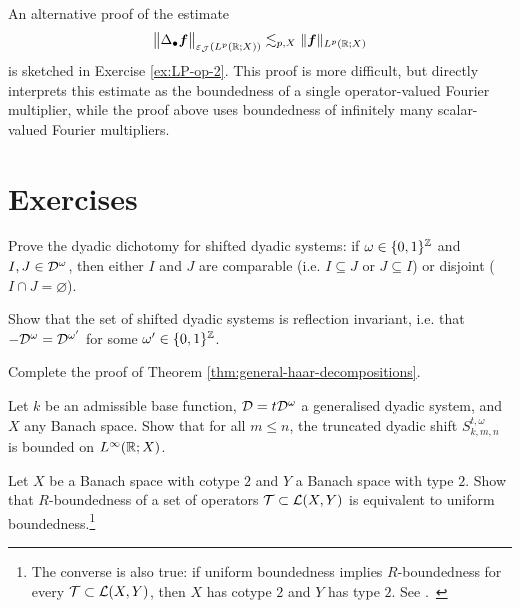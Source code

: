 An alternative proof of the estimate
\begin{equation*}
  \big\| \Delta_{\bullet} \bm{f} \big\|_{\varepsilon_{\mathcal{J}}(L^p(\mathbb{R};X))} \lesssim_{p,X} \|\bm{f}\|_{L^p(\mathbb{R};X)}
\end{equation*}
is sketched in Exercise \ref{ex:LP-op-2}.
This proof is more difficult, but directly interprets this estimate as the boundedness of a single operator-valued Fourier multiplier, while the proof above uses boundedness of infinitely many scalar-valued Fourier multipliers.

\section*{Exercises}

\begin{exercise}\label{ex:dyadic-dichotomy}
  Prove the dyadic dichotomy for shifted dyadic systems: if $\omega \in \{0,1\}^{\mathbb{Z}}$ and $I,J \in \mathcal{D}^{\omega}$, then either $I$ and $J$ are comparable (i.e. $I \subseteq J$ or $J \subseteq I$) or disjoint ($I \cap J = \varnothing$).
\end{exercise}

\begin{exercise}\label{ex:dyadic-refln-invariance}
  Show that the set of shifted dyadic systems is reflection invariant, i.e. that $-\mathcal{D}^{\omega} = \mathcal{D}^{\omega'}$ for some $\omega' \in \{0,1\}^{\mathbb{Z}}$.
\end{exercise}

\begin{exercise}\label{ex:mgale-reduction}
  Complete the proof of Theorem \ref{thm:general-haar-decompositions}.
\end{exercise}

\begin{exercise}
  Let $k$ be an admissible base function, $\mathcal{D} = t\mathcal{D}^{\omega}$ a generalised dyadic system, and $X$ any Banach space.
  Show that for all $m \leq n$, the truncated dyadic shift $S_{k,m,n}^{t,\omega}$ is bounded on $L^\infty(\mathbb{R};X)$.
\end{exercise}

\begin{exercise}\label{ex:R-bound-type}
  Let $X$ be a Banach space with cotype $2$ and $Y$ a Banach space with type $2$.
  Show that $R$-boundedness of a set of operators $\mathcal{T} \subset \mathcal{L}(X,Y)$ is equivalent to uniform boundedness.\footnote{The converse is also true: if uniform boundedness implies $R$-boundedness for every $\mathcal{T} \subset \mathcal{L}(X,Y)$, then $X$ has cotype $2$ and $Y$ has type $2$. See \cite[Proposition 8.6.1]{HNVW17}.\ }
\end{exercise}

